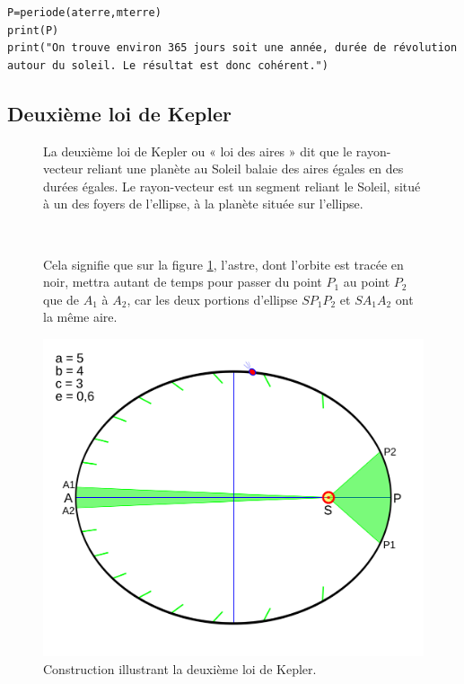 \begin{enumerate}
\begin{solution}
\begin{verbatim}
P=periode(aterre,mterre)
print(P)
print("On trouve environ 365 jours soit une année, durée de révolution autour du soleil. Le résultat est donc cohérent.")
\end{verbatim}
\end{solution}

\subsection*{Deuxième loi de Kepler}

\begin{figure}[ht!]
\begin{minipage}{0.5\linewidth}
La deuxième loi de Kepler ou « loi des aires » dit que le rayon-vecteur reliant une planète au Soleil balaie des aires égales en des durées égales. Le rayon-vecteur est un segment reliant le Soleil, situé à un des foyers de l'ellipse, à la planète située sur l'ellipse.

~\


Cela signifie que sur la figure \ref{fig02}, l'astre, dont l'orbite est tracée en noir, mettra autant de temps pour passer du point $P_1$ au point $P_2$ que de $A_1$ à $A_2$, car les deux portions d'ellipse $SP_1P_2$ et $SA_1A_2$ ont la même aire.

\end{minipage}\hfill
\begin{minipage}{0.48\linewidth}
  \begin{center}
\includegraphics[width=0.9\linewidth]{img/kepler_2}
\caption{Construction illustrant la deuxième loi de Kepler.}
\label{fig02}
  \end{center} 
\end{minipage}
\end{figure}


\end{enumerate}
